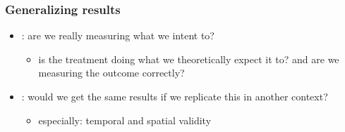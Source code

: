 \documentclass[aspectratio=43]{beamer}
\begin{document}
\begin{frame}
\frametitle{Generalizing results}
\centering

\begin{itemize}
  \item {}: are we really measuring what we intent to?
  \begin{itemize}
    \item is the treatment doing what we theoretically expect it to? and are we measuring the outcome correctly?
  \end{itemize}
  \item {}: would we get the same results if we replicate this in another context?
  \begin{itemize}
    \item especially: temporal and spatial validity
  \end{itemize}
\end{itemize}

\end{frame}

\end{document}
